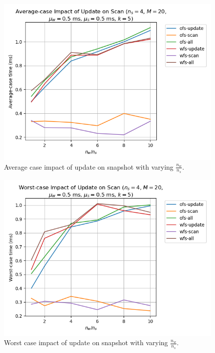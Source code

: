 \documentclass[conference,compsoc]{IEEEtran}
\begin{document}
\begin{figure}[!ht]
    \centering
    \includegraphics[width=\columnwidth]{images/exp3.png} 
    \caption{Average case impact of update on snapshot with varying \(\frac{n_w}{n_s}\).}
    \label{fig:exp3}
\end{figure}

\begin{figure}[!ht]
    \centering
    \includegraphics[width=\columnwidth]{images/exp4.png} 
    \caption{Worst case impact of update on snapshot with varying \(\frac{n_w}{n_s}\).}
    \label{fig:exp4}
\end{figure}
\end{document}
